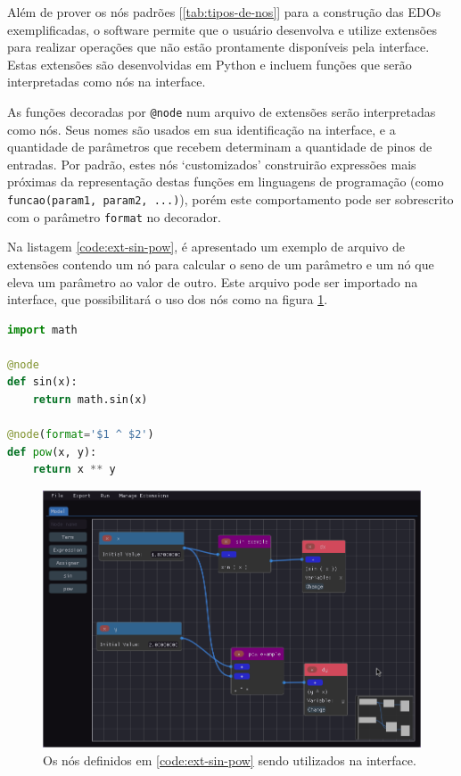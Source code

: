 \documentclass[
	12pt,				%
	openright,			%
	oneside,			%
	a4paper,			%
	main=brazil,
	english,			%
	]{ufsj-abntex2}
\begin{document}
Além de prover os nós padrões [\ref{tab:tipos-de-nos}] para a construção das EDOs exemplificadas, o software permite que o usuário desenvolva e utilize extensões para realizar operações que não estão prontamente disponíveis pela interface. Estas extensões são desenvolvidas em Python e incluem funções que serão interpretadas como nós na interface.

As funções decoradas por \texttt{@node} num arquivo de extensões serão interpretadas como nós. Seus nomes são usados em sua identificação na interface, e a quantidade de parâmetros que recebem determinam a quantidade de pinos de entradas. Por padrão, estes nós `customizados' construirão expressões mais próximas da representação destas funções em linguagens de programação (como \texttt{funcao(param1, param2, ...)}), porém este comportamento pode ser sobrescrito com o parâmetro \texttt{format} no decorador.

Na listagem \ref{code:ext-sin-pow}, é apresentado um exemplo de arquivo de extensões contendo um nó para calcular o seno de um parâmetro e um nó que eleva um parâmetro ao valor de outro. Este arquivo pode ser importado na interface, que possibilitará o uso dos nós como na figura \ref{fig:ext-sin-pow}.

\begin{lstlisting}[language=Python, label=code:ext-sin-pow, caption=Exemplo de definição dos nós de extensão seno e potência com código Python válido., float, xleftmargin=.35\textwidth]
import math

@node
def sin(x):
    return math.sin(x)

@node(format='$1 ^ $2')
def pow(x, y):
    return x ** y

\end{lstlisting}

\begin{figure}[h]
    \centering
    \includegraphics[scale=0.45]{imgs/ode-designer/ext-sin-pow.png} 
    \caption{Os nós definidos em \ref{code:ext-sin-pow} sendo utilizados na interface.}
    \label{fig:ext-sin-pow}
\end{figure}
\end{document}
